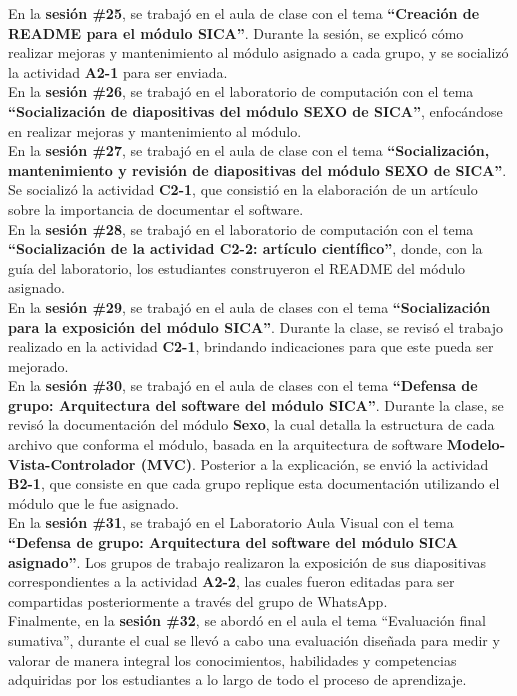 \documentclass[12pt]{article}
\begin{document}
\begin{multicols}{2}
En la \textbf{sesión \#25}, se trabajó en el aula de clase con el tema \textbf{``Creación de README para el módulo SICA''}. Durante la sesión, se explicó cómo realizar mejoras y mantenimiento al módulo asignado a cada grupo, y se socializó la actividad \textbf{A2-1} para ser enviada.\\
En la \textbf{sesión \#26}, se trabajó en el laboratorio de computación con el tema \textbf{``Socialización de diapositivas del módulo SEXO de SICA''}, enfocándose en realizar mejoras y mantenimiento al módulo.\\
En la \textbf{sesión \#27}, se trabajó en el aula de clase con el tema \textbf{``Socialización, mantenimiento y revisión de diapositivas del módulo SEXO de SICA''}. Se socializó la actividad \textbf{C2-1}, que consistió en la elaboración de un artículo sobre la importancia de documentar el software.\\
En la \textbf{sesión \#28}, se trabajó en el laboratorio de computación con el tema \textbf{``Socialización de la actividad C2-2: artículo científico''}, donde, con la guía del laboratorio, los estudiantes construyeron el README del módulo asignado.\\
En la \textbf{sesión \#29}, se trabajó en el aula de clases con el tema \textbf{``Socialización para la exposición del módulo SICA''}. Durante la clase, se revisó el trabajo realizado en la actividad \textbf{C2-1}, brindando indicaciones para que este pueda ser mejorado.\\
En la \textbf{sesión \#30}, se trabajó en el aula de clases con el tema \textbf{``Defensa de grupo: Arquitectura del software del módulo SICA''}. Durante la clase, se revisó la documentación del módulo \textbf{Sexo}, la cual detalla la estructura de cada archivo que conforma el módulo, basada en la arquitectura de software \textbf{Modelo-Vista-Controlador (MVC)}. Posterior a la explicación, se envió la actividad \textbf{B2-1}, que consiste en que cada grupo replique esta documentación utilizando el módulo que le fue asignado.\\
En la \textbf{sesión \#31}, se trabajó en el Laboratorio Aula Visual con el tema \textbf{``Defensa de grupo: Arquitectura del software del módulo SICA asignado''}. Los grupos de trabajo realizaron la exposición de sus diapositivas correspondientes a la actividad \textbf{A2-2}, las cuales fueron editadas para ser compartidas posteriormente a través del grupo de WhatsApp.\\
Finalmente, en la \textbf{sesión \#32}, se abordó en el aula el tema “Evaluación final sumativa”, durante el cual se llevó a cabo una evaluación diseñada para medir y valorar de manera integral los conocimientos, habilidades y competencias adquiridas por los estudiantes a lo largo de todo el proceso de aprendizaje.


\end{multicols}
\end{document}
